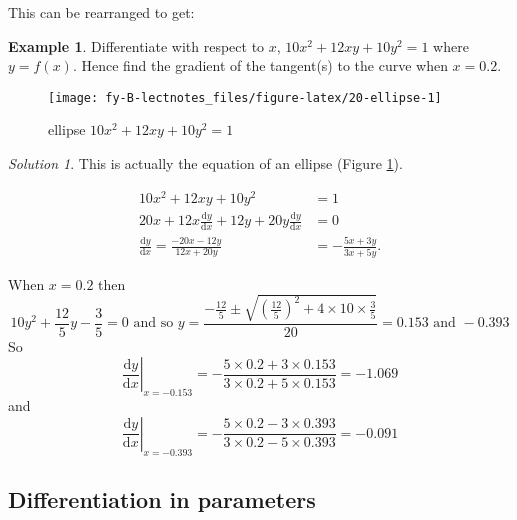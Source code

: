 \documentclass[
  11pt,
  oneside]{book}
\newcommand{\slide}{}
\theoremstyle{definition}
\theoremstyle{definition}
\newtheorem{example}{Example}[chapter]
\theoremstyle{definition}
\theoremstyle{definition}
\theoremstyle{remark}
\newtheorem*{solution}{Solution}
\begin{document}
\begin{slidesonly}

\slide

This can be rearranged to get:

\end{slidesonly}

\slide

\begin{example}
Differentiate with respect to \(x\), \(10x^2 + 12xy + 10y^2 = 1\) where \(y = f(x)\). Hence find the gradient of the tangent(s) to the curve when \(x=0.2\).
\end{example}

\begin{figure}

{\centering \texttt{[image: fy-B-lectnotes\_files/figure-latex/20-ellipse-1]} 

}

\caption{ellipse $10x^2 + 12xy + 10y^2 = 1$}\label{fig:20-ellipse}
\end{figure}

\begin{solution}
This is actually the equation of an ellipse (Figure \ref{fig:20-ellipse}).

\begin{align*}
10x^2 + 12xy + 10y^2 &= 1\\
20x+12x\frac{\mathrm{d} y}{\mathrm{d} x}+12y+20y\frac{\mathrm{d} y}{\mathrm{d} x} &=0\\
\frac{\mathrm{d} y}{\mathrm{d} x} = \frac{-20x-12y}{12x+20y} &= -\frac{5x+3y}{3x+5y}.
\end{align*}

When \(x=0.2\) then
\[
10y^2+\frac{12}5y-\frac35=0\text{ and so }y = \frac{-\frac{12}5\pm\sqrt{\left(\frac{12}5\right)^2+4\times10\times\frac35}}{20} = 0.153\text{ and }-0.393
\]
So
\[
\left.\frac{\mathrm{d} y}{\mathrm{d} x}\right|_{x=-0.153} = -\frac{5\times0.2+3\times 0.153}{3\times0.2+5\times0.153} = -1.069
\]
and
\[
\left.\frac{\mathrm{d} y}{\mathrm{d} x}\right|_{x=-0.393} = -\frac{5\times0.2-3\times 0.393}{3\times0.2-5\times0.393} = -0.091
\]
\end{solution}

\slide

\begin{slidesonly}

\phantom{a}
\slide

\end{slidesonly}

\subsection{Differentiation in parameters}\label{differentiation-in-parameters}
\end{document}
